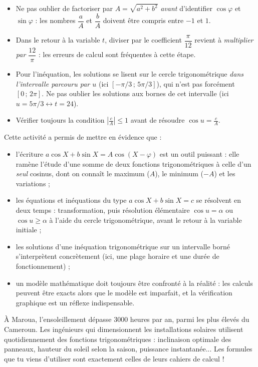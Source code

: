 \documentclass[11pt]{article}
\newcounter{popsec}
\newcounter{popsub}
\newcommand{\courssub}[1]{%
  \stepcounter{popsub}%
  \par\vspace{9pt}\noindent{\popxbold\fontsize{11.5}{13}\selectfont\color{popink}{\color{poporange}\thepopsec.\thepopsub}\hspace{6pt}#1}\par\nopagebreak\vspace{4pt}
}
\begin{document}
\begin{attention}
\begin{itemize}
\item Ne pas oublier de factoriser par $A=\sqrt{a^{2}+b^{2}}$ \emph{avant} d'identifier $\cos\varphi$ et $\sin\varphi$ : les nombres $\dfrac{a}{A}$ et $\dfrac{b}{A}$ doivent être compris entre $-1$ et $1$.
\item Dans le retour à la variable $t$, diviser par le coefficient $\dfrac{\pi}{12}$ revient à \emph{multiplier par $\dfrac{12}{\pi}$} : les erreurs de calcul sont fréquentes à cette étape.
\item Pour l'inéquation, les solutions se lisent sur le cercle trigonométrique \emph{dans l'intervalle parcouru par $u$} (ici $[-\pi/3\,;\,5\pi/3]$), qui n'est pas forcément $[0\,;\,2\pi]$. Ne pas oublier les solutions aux bornes de cet intervalle (ici $u=5\pi/3 \leftrightarrow t=24$).
\item Vérifier toujours la condition $\left|\frac{c}{A}\right|\leq 1$ avant de résoudre $\cos u = \frac{c}{A}$.
\end{itemize}
\end{attention}

\courssub{Bilan de l'activité}

Cette activité a permis de mettre en évidence que :
\begin{itemize}
\item l'écriture $a\cos X+b\sin X=A\cos(X-\varphi)$ est un outil puissant : elle ramène l'étude d'une somme de deux fonctions trigonométriques à celle d'un \emph{seul} cosinus, dont on connaît le maximum ($A$), le minimum ($-A$) et les variations ;
\item les équations et inéquations du type $a\cos X+b\sin X=c$ se résolvent en deux temps : transformation, puis résolution élémentaire $\cos u=\alpha$ ou $\cos u\geq\alpha$ à l'aide du cercle trigonométrique, avant le retour à la variable initiale ;
\item les solutions d'une inéquation trigonométrique sur un intervalle borné s'interprètent concrètement (ici, une plage horaire et une durée de fonctionnement) ;
\item un modèle mathématique doit toujours être confronté à la réalité : les calculs peuvent être exacts alors que le modèle est imparfait, et la vérification graphique est un réflexe indispensable.
\end{itemize}

\begin{savaistu}
À Maroua, l'ensoleillement dépasse $3000$ heures par an, parmi les plus élevés du Cameroun. Les ingénieurs qui dimensionnent les installations solaires utilisent quotidiennement des fonctions trigonométriques : inclinaison optimale des panneaux, hauteur du soleil selon la saison, puissance instantanée... Les formules que tu viens d'utiliser sont exactement celles de leurs cahiers de calcul !
\end{savaistu}
\end{document}
